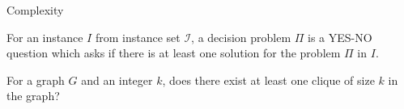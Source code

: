 \documentclass{beamer}
\begin{document}
\begin{comment}
\item $L$ is in $NP$.
\end{enumerate}
\end{itemize}
\end{frame}


\begin{frame}{Is $P = NP$ or $P \not= NP$?}

\newcommand{\boundellipse}[3]%
{(#1) ellipse (#2 and #3)
}

\begin{figure}[!ht]
\centering


\begin{tikzpicture}
\draw (0,0) circle (1.5cm);
\draw \boundellipse{0,-0.75}{1.1}{0.75};
\draw (-1.5,3) .. controls (-1,0) and (1,0) .. (1.5,3);
\node at (0,2) {\tiny $NP$-Hard};
\node at (0,1.2) {\tiny $NP$-Complete};
\node at (-1,0) {\tiny $NP$};
\node at (0,-0.75) {\tiny $P$};
\node at (0,-2) {\tiny $P \not= NP$};
\node at (4,1) [label={[rotate=90]{\tiny complexity}}];
\draw[->] (4,-2) -- (4,4);
\draw (8,0) circle (1.5cm);

\draw (6.5,2) .. controls (5.40,-2.7) and (10.6,-2.7) .. (9.5,2);
\node at (8,2) {\tiny $NP$-Hard};
\node at (8,0) {\tiny $NP$-Complete = $P$ = $NP$};

\node at (8,-2) {\tiny $P = NP$};
\end{tikzpicture}
\caption{\tiny Euler diagram for $P$, $NP$, $NP$-hard and $NP$-complete set of problems}
\end{figure}
\end{frame}
\end{comment}

\begin{frame}{Complexity}

\begin{definition}
For an instance $I$ from instance set $\mathcal{I}$, a \color{red} decision problem \color{black} $\Pi$ is a YES-NO question which asks if
there is at least one solution for the problem $\Pi$ in $I$.
\end{definition}
\pause
\begin{example}
For a graph $G$ and an integer $k$, does there exist at least one clique of size $k$ in the graph? 

\end{example}
\end{frame}
\end{document}
